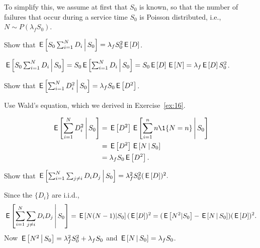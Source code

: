 To simplify this, we assume at first that $S_0$ is known, so that the number of failures that occur during a service time $S_0$ is Poisson distributed, i.e., $N\sim P(\lambda_f S_0)$.

\begin{exercise}[\faFlask]
  Show that $\,\mathsf{E}\left[S_0 \sum_{i=1}^N D_i\,\middle|\, S_0\right] = \lambda_f S_0^2 \,\mathsf{E}\left[D\right]$.
\begin{solution}
$\,\mathsf{E}\left[S_0 \sum_{i=1}^N D_i\,\middle|\, S_0\right] = 
S_0 \,\mathsf{E}\left[\sum_{i=1}^N D_i\,\middle|\, S_0\right] = S_0 \,\mathsf{E}\left[D\right] \,\mathsf{E}\left[N\right] = \lambda_f \,\mathsf{E}\left[D\right] S_0^2$.
\end{solution}
\end{exercise}

\begin{exercise}[\faFlask]
Show that $\,\mathsf{E}\left[\sum_{i=1}^N D_i^2\,\middle|\, S_0\right] = \lambda_f S_0 \,\mathsf{E}\left[D^2\right]$.
\begin{hint}
  Use Wald's equation, which we derived in Exercise~\ref{ex:16}.
\end{hint}
\begin{solution}
  \begin{align*}
    \E{\sum_{i=1}^N D_i^2\given S_0} 
&= \E{D^2}\E{ \sum_{i=1}^n n \1{N=n}\given S_0}\\
&= \E{D^2} \E{N\given S_0} \\
&= \lambda_f S_0 \E{D^2}.
  \end{align*}
\end{solution}
\end{exercise}

\begin{exercise}[\faCalculator]
Show that 
$\,\mathsf{E}\left[\sum_{i=1}^N \sum_{j\neq i} D_i D_j\,\middle|\, S_0\right] = \lambda_f^2 S_0^2 (\,\mathsf{E}\left[D\right])^2.$
\begin{solution}
Since the $\{D_i\}$ are i.i.d., 
  \begin{equation*}
\,\mathsf{E}\left[\sum_{i=1}^N \sum_{j\neq i} D_i D_j\,\middle|\, S_0\right]
= \,\mathsf{E}\left[N(N-1)|S_0\right] (\,\mathsf{E}\left[D\right])^2 
= (\,\mathsf{E}\left[N^2|S_0\right]-\,\mathsf{E}\left[N\,\middle|\, S_0\right]) (\,\mathsf{E}\left[D\right])^2.
  \end{equation*}
Now $\,\mathsf{E}\left[N^2\,\middle|\, S_0\right]=\lambda_f^2 S_0^2 +\lambda_f S_0$ and $\,\mathsf{E}\left[N\,\middle|\, S_0\right] = \lambda_f S_0$.
\end{solution}
\end{exercise}

